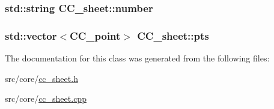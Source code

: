 \hypertarget{a00045_a075899cc4758e99aa40c51005c2b6458}{
\subsubsection[{number}]{\setlength{\rightskip}{0pt plus 5cm}std\-::string C\-C\-\_\-sheet\-::number\hspace{0.3cm}{\ttfamily [private]}}}\label{a00045_a075899cc4758e99aa40c51005c2b6458}
\hypertarget{a00045_a518af96eb5163fccb757e5f1d23fef17}{
\subsubsection[{pts}]{\setlength{\rightskip}{0pt plus 5cm}std\-::vector$<${\bf C\-C\-\_\-point}$>$ C\-C\-\_\-sheet\-::pts\hspace{0.3cm}{\ttfamily [private]}}}\label{a00045_a518af96eb5163fccb757e5f1d23fef17}


The documentation for this class was generated from the following files\-:\begin{DoxyCompactItemize}
\item 
src/core/\hyperlink{a00212}{cc\-\_\-sheet.\-h}\item 
src/core/\hyperlink{a00211}{cc\-\_\-sheet.\-cpp}\end{DoxyCompactItemize}
